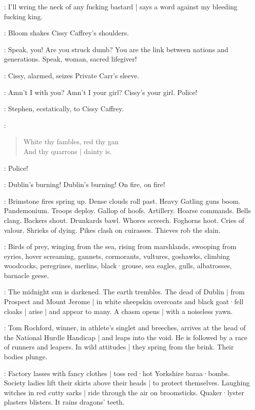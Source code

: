 \Carr:
I'll wring the neck of any fucking bastard |
says a word against my bleeding fucking king.

:
Bloom shakes Cissy Caffrey's shoulders.

\Bloom:
Speak,
you!
Are you struck dumb?
You are the link between nations and generations.
Speak,
woman,
sacred lifegiver!

:
Cissy,
alarmed,
seizes Private Carr's sleeve.

\Cissy:
Amn't I with you?
Amn't I your girl?
Cissy's your girl.
Police!

:
Stephen,
ecstatically,
to Cissy Caffrey.

\Stephen:
\begin{verse}
    White thy fambles,
        red thy gan\\
    And thy quarrons |
        dainty is.
\end{verse}

\Voices:
Police!

\DistantVoices:
Dublin's burning!
Dublin's burning!
%
On fire,
on fire!

:
Brimstone fires spring up.
Dense clouds roll past.
Heavy Gatling guns boom.
Pandemonium.
Troops deploy.
Gallop of hoofs.
Artillery.
Hoarse commands.
Bells clang.
Backers shout.
Drunkards bawl.
Whores screech.
Foghorns hoot.
Cries of valour.
Shrieks of dying.
Pikes clash on cuirasses.
Thieves rob the slain.

:
Birds of prey,
winging from the sea,
rising from marshlands,
swooping from eyries,
hover screaming,
gannets,
cormorants,
vultures,
goshawks,
climbing woodcocks,
peregrines,
merlins,
black·grouse,
sea eagles,
gulls,
albatrosses,
barnacle geese.

:
The midnight sun is darkened.
The earth trembles.
%
The dead of Dublin |
from Prospect and Mount Jerome |
in white sheepskin overcoats and black goat·fell cloaks |
arise |
and appear to many.
A chasm opens |
with a noiseless yawn.

:
Tom Rochford,
winner,
in athlete's singlet and breeches,
arrives at the head of the National Hurdle Handicap |
and leaps into the void.
He is followed by a race of runners and leapers.
In wild attitudes |
they spring from the brink.
Their bodies plunge.

:
Factory lasses with fancy clothes |
toss red·hot Yorkshire baraa·bombs.
Society ladies lift their skirts above their heads |
to protect themselves.
Laughing witches in red cutty sarks |
ride through the air on broomsticks.
Quaker·lyster plasters blisters.
%
It rains dragons' teeth.

